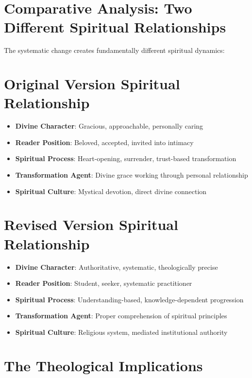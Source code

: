\documentclass[11pt,twoside]{book}
\begin{document}
\section*{Comparative Analysis: Two Different Spiritual Relationships}
\label{sec:org1aa0fd3}

The systematic change creates fundamentally different spiritual dynamics:
\section*{Original Version Spiritual Relationship}
\label{sec:orgfb60d70}
\begin{itemize}
\item \textbf{\textbf{Divine Character}}: Gracious, approachable, personally caring
\item \textbf{\textbf{Reader Position}}: Beloved, accepted, invited into intimacy
\item \textbf{\textbf{Spiritual Process}}: Heart-opening, surrender, trust-based transformation
\item \textbf{\textbf{Transformation Agent}}: Divine grace working through personal relationship
\item \textbf{\textbf{Spiritual Culture}}: Mystical devotion, direct divine connection
\end{itemize}
\section*{Revised Version Spiritual Relationship}
\label{sec:orgf975a1c}
\begin{itemize}
\item \textbf{\textbf{Divine Character}}: Authoritative, systematic, theologically precise
\item \textbf{\textbf{Reader Position}}: Student, seeker, systematic practitioner
\item \textbf{\textbf{Spiritual Process}}: Understanding-based, knowledge-dependent progression
\item \textbf{\textbf{Transformation Agent}}: Proper comprehension of spiritual principles
\item \textbf{\textbf{Spiritual Culture}}: Religious system, mediated institutional authority
\end{itemize}
\section*{The Theological Implications}
\label{sec:org26e6350}
\end{document}
